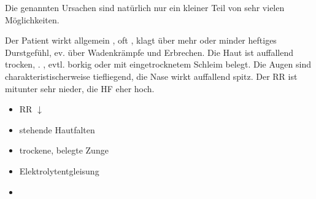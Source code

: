 Die genannten Ursachen sind natürlich nur ein kleiner Teil von sehr vielen
Möglichkeiten.

{%
Der Patient wirkt allgemein ,
oft , klagt über mehr oder minder heftiges
Durstgefühl, ev. über Wadenkrämpfe und Erbrechen. Die Haut
ist auffallend trocken, . ,
evtl. borkig oder mit eingetrocknetem Schleim belegt. Die Augen sind charakteristischerweise tiefliegend, die Nase wirkt auffallend spitz. Der RR ist mitunter sehr nieder,
die HF eher hoch. 
}{
\begin{itemize}
    \item RR ${\downarrow}$
    \item stehende Hautfalten
    \item trockene, belegte Zunge
    \item Elektrolytentgleisung
    \item {}
\end{itemize}
}{}{}{}


